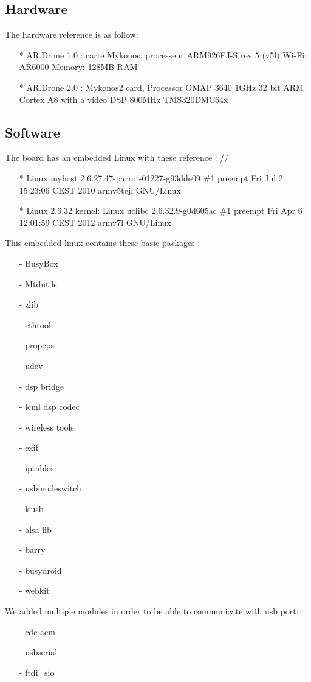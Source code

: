 \subsection{Hardware}
The hardware reference is as follow:
\begin{itemize}
\item[*] AR.Drone 1.0 : carte Mykonos, processeur ARM926EJ-S rev 5 (v5l) Wi-Fi: AR6000 Memory: 128MB RAM
\item[*] AR.Drone 2.0 : Mykonos2 card, Processor OMAP 3640 1GHz 32 bit ARM Cortex A8 with a video DSP 800MHz TMS320DMC64x
\end{itemize}

\subsection{Software}
The board has an embedded Linux with these reference : //
\begin{itemize}
\item[*] Linux myhost 2.6.27.47-parrot-01227-g93dde09 \#1 preempt Fri Jul 2 15:23:06 CEST 2010 armv5tejl GNU/Linux 
\item[*] Linux 2.6.32 kernel: Linux uclibc 2.6.32.9-g0d605ac \#1 preempt Fri Apr 6 12:01:59 CEST 2012 armv7l GNU/Linux 
\end{itemize}
This embedded linux contains these basic packages :
\begin{itemize}
\item[-] BusyBox
\item[-] Mtdutils
\item[-] zlib
\item[-] ethtool
\item[-] propcps
\item[-] udev
\item[-] dsp bridge 
\item[-] lcml dsp codec
\item[-] wireless tools
\item[-] exif
\item[-] iptables
\item[-] usbmodeswitch
\item[-] lsusb
\item[-] alsa lib
\item[-] barry
\item[-] busydroid
\item[-] webkit
\end{itemize}

We added multiple modules in order to be able to communicate with usb port:
\begin{itemize}
\item[-] cdc-acm 
\item[-] usbserial
\item[-] ftdi\_sio
\end{itemize}

